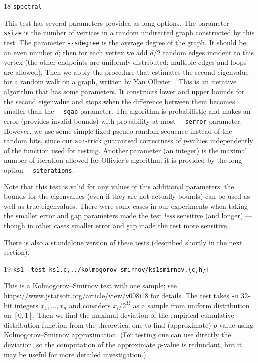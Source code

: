 \documentclass[12pt,a4paper,fullpage]{article}
\begin{document}
\begin{description}
\item{18} \texttt{spectral}

This test has several parameters provided as long options. The parameter \hbox{\texttt{{-}-ssize}} is the number of vertices in a random undirected graph constructed by this test. The parameter \texttt{{-}-sdegree} is the average degree of the graph. It should be an even number $d$; then for each vertex we add $d/2$ random edges incident to this vertex (the other endpoints are uniformly distributed; multiple edges and loops are allowed). Then we apply the procedure that estimates the second eigenvalue for a random walk on a graph, written by Yan Ollivier~\cite{ollivier}. This is an iterative algorithm that has some parameters. It constructs lower and upper bounds for the second eigenvalue and stops when the difference between them becomes smaller than the \texttt{{-}-sgap} parameter. The algorithm is probabilistic and makes an error (provides invalid bounds) with probability at most \texttt{{-}-serror} parameter. However, we use some simple fixed pseudo-random sequence instead of the random bits, since our \texttt{xor}-trick guaranteed correctness of $p$-values independently of the function used for testing. Another parameter (an integer) is the maximal number of iteration allowed for Ollivier's algorithm; it is provided by the long option \texttt{{-}-siterations}. 

Note that this test is valid for any values of this additional parameters: the bounds for the eigenvalues (even if they are not actually bounds) can be used as well as true eigenvalues.  There were some cases in our experiments when taking the smaller error and gap parameters made the test \emph{less} sensitive (and longer) --- though in other cases smaller error and gap made the test more sensitive.

There is also a standalone version of these tests (described shortly in the next section).

\item{19} \texttt{ks1 [test\_ks1.c,../kolmogorov-smirnov/ks1smirnov.\{c,h\}] }

This is a Kolmogorov--Smirnov test with one sample; see \url{https://www.jstatsoft.org/article/view/v008i18} for details. The test takes \texttt{-n} $32$-bit integers $x_1,\ldots,x_n$ and considers $x_i/2^{32}$ as a sample from uniform distribution on $[0,1]$. Then we find the maximal deviation of the empirical cumulative distribution function from the theoretical one to find (approximate) $p$-value using Kolmogorov--Smirnov approximation. (For testing one can use directly the deviation, so the computation of the approximate $p$-value is redundant, but it may be useful for more detailed investigation.) 


\end{description}
\end{document}
